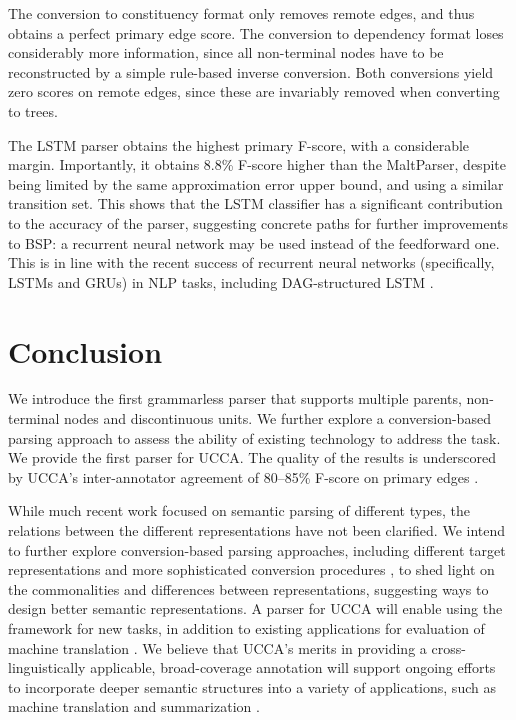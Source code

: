 \documentclass[11pt]{article}
\begin{document}
The conversion to constituency format only removes remote edges,
and thus obtains a perfect primary edge score.
The conversion to dependency format loses considerably more information, since
all non-terminal nodes have to be reconstructed by a
simple rule-based inverse conversion. Both conversions yield zero scores on remote edges,
since these are invariably removed when converting to trees.

The LSTM parser obtains the highest primary F-score,
with a considerable margin. Importantly, it obtains 8.8\% F-score higher than the MaltParser,
despite being limited by the same approximation error upper bound, and using a similar
transition set.
This shows that the LSTM classifier has a significant contribution to the accuracy of
the parser, suggesting concrete paths for further improvements to BSP:
a recurrent neural network may be used instead of the feedforward one.
This is in line with the recent success of recurrent neural networks
(specifically, LSTMs and GRUs) in NLP tasks, including DAG-structured LSTM
\cite{zhu-sobhani-guo:2016:N16-1}.

\section{Conclusion}\label{sec:conclusion}

We introduce the first grammarless parser that supports multiple parents, non-terminal
nodes and discontinuous units.
We further explore a conversion-based parsing approach to assess the ability of existing
technology to address the task.
We provide the first parser for UCCA.
The quality of the results is underscored by UCCA's inter-annotator
agreement of 
80--85\% F-score on primary edges \cite{abend2013universal}.

While much recent work focused on semantic parsing of different types,
the relations between the different representations have not been clarified.
We intend to further explore conversion-based parsing approaches,
including different target representations and more sophisticated conversion procedures \cite{kong-15},
to shed light on the commonalities and differences between representations, suggesting ways to
design better semantic representations.
A parser for UCCA will enable using the framework for new tasks, in addition to existing
applications for evaluation of machine translation \cite{sulem2015conceptual,birch2016hume}.
We believe that UCCA's merits in providing a cross-linguistically applicable, broad-coverage
annotation will support ongoing efforts to incorporate deeper semantic structures
into a variety of applications, such as machine translation \cite{jones2012semantics}
and summarization \cite{liu2015toward}.




\end{document}
